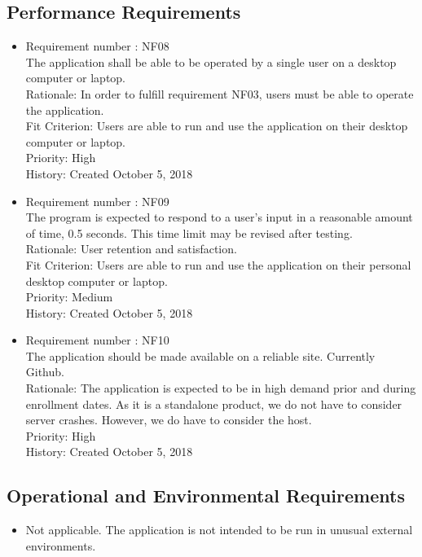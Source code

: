\documentclass[12pt, titlepage]{article}
\begin{document}
\subsection{Performance Requirements}
\begin{itemize}
\item Requirement number : NF08\\
The application shall be able to be operated by a single user on a desktop computer or laptop.\\
Rationale: In order to fulfill requirement NF03, users must be able to operate the application.\\
Fit Criterion: Users are able to run and use the application on their desktop computer or laptop.\\
Priority: High\\
History: Created October 5, 2018

\item Requirement number : NF09\\
The program is expected to respond to a user's input in a reasonable amount of time, 0.5 seconds. This time limit may be revised after testing.  \\
Rationale: User retention and satisfaction.\\
Fit Criterion: Users are able to run and use the application on their personal desktop computer or laptop.\\
Priority: Medium\\
History: Created October 5, 2018

\item Requirement number : NF10\\
The application should be made available on a reliable site. Currently Github. \\
Rationale: The application is expected to be in high demand prior and during enrollment dates. As it is a standalone product, we do not have to consider server crashes. However, we do have to consider the host. \\
Priority: High\\
History: Created October 5, 2018

\end{itemize}
\subsection{Operational and Environmental Requirements}
\begin{itemize}
\item Not applicable.  The application is not intended to be run in unusual external environments.

\end{itemize}
\end{document}
